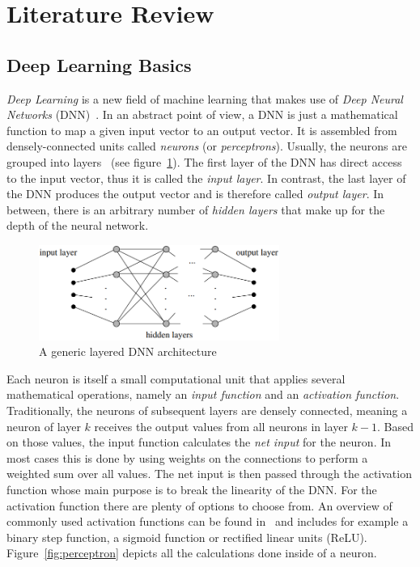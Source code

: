 \section{Literature Review}

\subsection{Deep Learning Basics}
\emph{Deep Learning} is a new field of machine learning that makes use of \emph{Deep Neural Networks} (DNN)~\cite[pp.~125f]{nn_intro96}. In an abstract point of view, a DNN is just a mathematical function to map a given input vector to an output vector. It is assembled from densely-connected units called \emph{neurons} (or \emph{perceptrons}). Usually, the neurons are grouped into layers~\cite[p.~125]{nn_intro96} (see figure~\ref{fig:layered_architecture}). The first layer of the DNN has direct access to the input vector, thus it is called the \emph{input layer}. In contrast, the last layer of the DNN produces the output vector and is therefore called \emph{output layer}. In between, there is an arbitrary number of \emph{hidden layers} that make up for the depth of the neural network.

\begin{figure}[h]
    \centering
    \includegraphics[width=0.7\textwidth]{images/generic_layered_architecture}
    \caption{A generic layered DNN architecture~\cite[p.~126]{nn_intro96}}
    \label{fig:layered_architecture}
\end{figure}

Each neuron is itself a small computational unit that applies several mathematical operations, namely an \emph{input function} and an \emph{activation function}. Traditionally, the neurons of subsequent layers are densely connected, meaning a neuron of layer $k$ receives the output values from all neurons in layer $k-1$. Based on those values, the input function calculates the \emph{net input} for the neuron. In most cases this is done by using weights on the connections to perform a weighted sum over all values. The net input is then passed through the activation function whose main purpose is to break the linearity of the DNN. For the activation function there are plenty of options to choose from. An overview of commonly used activation functions can be found in~\cite{act_funcs18} and includes for example a binary step function, a sigmoid function or rectified linear units (ReLU). Figure~\ref{fig:perceptron} depicts all the calculations done inside of a neuron.

